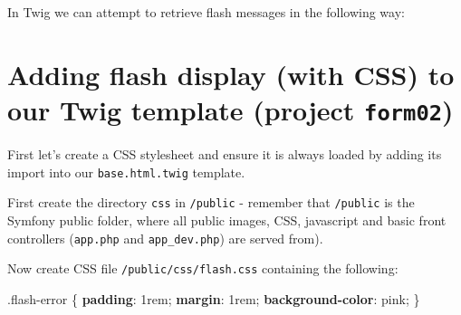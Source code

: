 \documentclass[a4paperpaper,openright]{book}
\newenvironment{Shaded}{}{}
\newcommand{\ConstantTok}[1]{\textcolor[rgb]{0.53,0.00,0.00}{#1}}
\newcommand{\DataTypeTok}[1]{\textcolor[rgb]{0.56,0.13,0.00}{#1}}
\newcommand{\DecValTok}[1]{\textcolor[rgb]{0.25,0.63,0.44}{#1}}
\newcommand{\FunctionTok}[1]{\textcolor[rgb]{0.02,0.16,0.49}{#1}}
\newcommand{\KeywordTok}[1]{\textcolor[rgb]{0.00,0.44,0.13}{\textbf{#1}}}
\newcommand{\NormalTok}[1]{#1}
\newcommand{\OperatorTok}[1]{\textcolor[rgb]{0.40,0.40,0.40}{#1}}
\newcommand{\OtherTok}[1]{\textcolor[rgb]{0.00,0.44,0.13}{#1}}
\newcommand{\StringTok}[1]{\textcolor[rgb]{0.25,0.44,0.63}{#1}}
\begin{document}
\begin{Shaded}
\end{Shaded}

In Twig we can attempt to retrieve flash messages in the following way:

\begin{Shaded}
\end{Shaded}

\hypertarget{adding-flash-display-with-css-to-our-twig-template-project-form02}{%
\section{\texorpdfstring{Adding flash display (with CSS) to our Twig
template (project
\texttt{form02})}{Adding flash display (with CSS) to our Twig template (project form02)}}\label{adding-flash-display-with-css-to-our-twig-template-project-form02}}

First let's create a CSS stylesheet and ensure it is always loaded by
adding its import into our \texttt{base.html.twig} template.

First create the directory \texttt{css} in \texttt{/public} - remember
that \texttt{/public} is the Symfony public folder, where all public
images, CSS, javascript and basic front controllers (\texttt{app.php}
and \texttt{app\_dev.php}) are served from).

Now create CSS file \texttt{/public/css/flash.css} containing the
following:

\begin{Shaded}
\begin{Highlighting}[]
    \FunctionTok{.flash-error}\NormalTok{ \{}
        \KeywordTok{padding}\NormalTok{: }\DecValTok{1}\DataTypeTok{rem}\OperatorTok{;}
        \KeywordTok{margin}\NormalTok{: }\DecValTok{1}\DataTypeTok{rem}\OperatorTok{;}
        \KeywordTok{background-color}\NormalTok{: }\ConstantTok{pink}\OperatorTok{;}
\NormalTok{    \}}
\end{Highlighting}
\end{Shaded}
\end{document}
